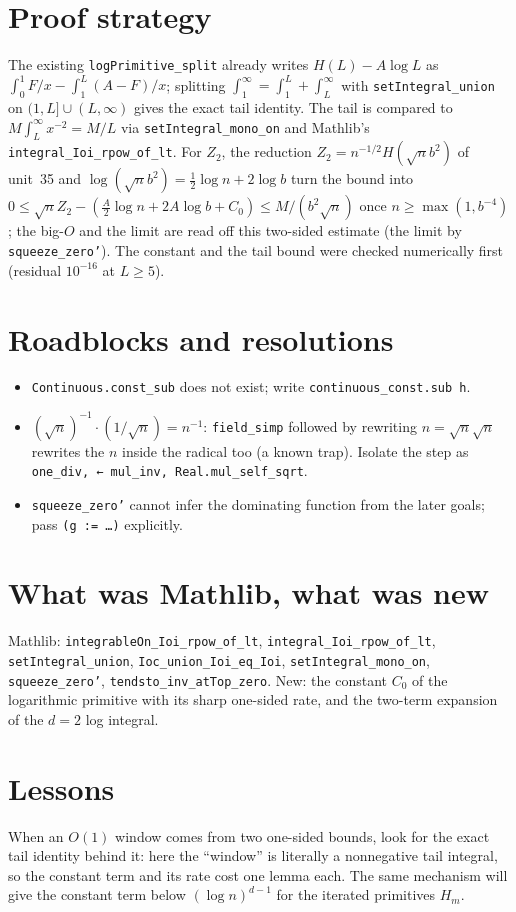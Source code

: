 \documentclass[11pt]{article}
\begin{document}
\section{Proof strategy}
The existing \texttt{logPrimitive\_split} already writes $H(L)-A\log L$ as
$\int_0^1F/x-\int_1^L(A-F)/x$; splitting $\int_1^\infty=\int_1^L+\int_L^\infty$ with
\texttt{setIntegral\_union} on $(1,L]\cup(L,\infty)$ gives the exact tail identity. The tail is
compared to $M\int_L^\infty x^{-2}=M/L$ via \texttt{setIntegral\_mono\_on} and Mathlib's
\texttt{integral\_Ioi\_rpow\_of\_lt}. For $Z_2$, the reduction $Z_2=n^{-1/2}H(\sqrt nb^2)$ of unit~35
and $\log(\sqrt nb^2)=\tfrac12\log n+2\log b$ turn the bound into
$0\le\sqrt nZ_2-(\tfrac A2\log n+2A\log b+C_0)\le M/(b^2\sqrt n)$ once $n\ge\max(1,b^{-4})$; the
big-$O$ and the limit are read off this two-sided estimate (the limit by \texttt{squeeze\_zero'}).
The constant and the tail bound were checked numerically first (residual $10^{-16}$ at $L\ge5$).

\section{Roadblocks and resolutions}
\begin{itemize}
\item \texttt{Continuous.const\_sub} does not exist; write \texttt{continuous\_const.sub h}.
\item $(\sqrt n)^{-1}\cdot(1/\sqrt n)=n^{-1}$: \texttt{field\_simp} followed by rewriting
$n=\sqrt n\sqrt n$ rewrites the $n$ inside the radical too (a known trap). Isolate the step as
\texttt{one\_div, ← mul\_inv, Real.mul\_self\_sqrt}.
\item \texttt{squeeze\_zero'} cannot infer the dominating function from the later goals; pass
\texttt{(g := …)} explicitly.
\end{itemize}

\section{What was Mathlib, what was new}
Mathlib: \texttt{integrableOn\_Ioi\_rpow\_of\_lt}, \texttt{integral\_Ioi\_rpow\_of\_lt},
\texttt{setIntegral\_union}, \texttt{Ioc\_union\_Ioi\_eq\_Ioi}, \texttt{setIntegral\_mono\_on},
\texttt{squeeze\_zero'}, \texttt{tendsto\_inv\_atTop\_zero}. New: the constant $C_0$ of the logarithmic
primitive with its sharp one-sided rate, and the two-term expansion of the $d=2$ log integral.

\section{Lessons}
When an $O(1)$ window comes from two one-sided bounds, look for the exact tail identity behind it:
here the ``window'' is literally a nonnegative tail integral, so the constant term and its rate cost
one lemma each. The same mechanism will give the constant term below $(\log n)^{d-1}$ for the
iterated primitives $H_m$.
\end{document}
